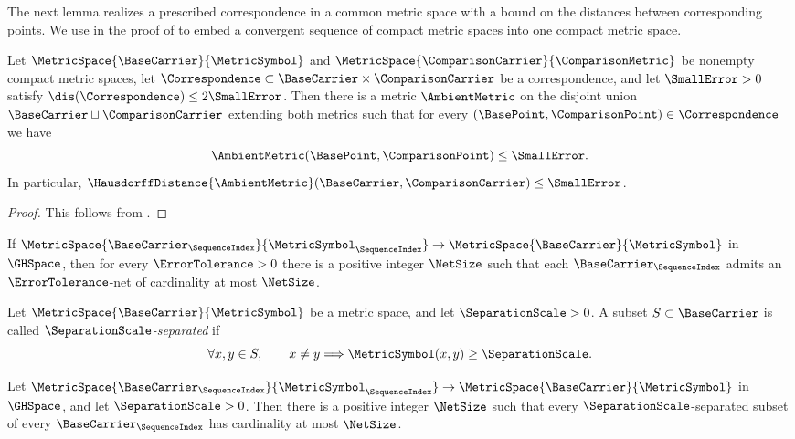 The next lemma realizes a prescribed correspondence in a common metric space
with a bound on the distances between corresponding points.
We use  in the proof of
to embed a convergent sequence of compact metric spaces into one compact metric space.

\begin{lemma}\label{lem:correspondence-embedding}
Let
$\MetricSpace{\BaseCarrier}{\MetricSymbol}$
and
$\MetricSpace{\ComparisonCarrier}{\ComparisonMetric}$
be nonempty compact metric spaces,
let
$\Correspondence\subset\BaseCarrier\times\ComparisonCarrier$
be a correspondence,
and let
$\SmallError>0$
satisfy
$\dis(\Correspondence)\leq2\SmallError$.
Then there is a metric
$\AmbientMetric$
on the disjoint union
$\BaseCarrier\sqcup\ComparisonCarrier$
extending both metrics such that for every
$(\BasePoint,\ComparisonPoint)\in\Correspondence$
we have
\[
 \AmbientMetric(\BasePoint,\ComparisonPoint)\leq\SmallError.
\]
In particular,
$\HausdorffDistance{\AmbientMetric}(\BaseCarrier,\ComparisonCarrier)\leq\SmallError$.
\end{lemma}

\begin{proof}
This follows from
\cite[proof of Theorem~7.3.25, pp.~257--258]{BuragoBuragoIvanov2001}.
\end{proof}

\begin{theorem}\label{thm:uniform-nets}
If
$\MetricSpace{\BaseCarrier_\SequenceIndex}{\MetricSymbol_\SequenceIndex}
 \to\MetricSpace{\BaseCarrier}{\MetricSymbol}$
in
$\GHSpace$,
then for every
$\ErrorTolerance>0$
there is a positive integer
$\NetSize$
such that each
$\BaseCarrier_\SequenceIndex$
admits an
$\ErrorTolerance$-net
of cardinality at most
$\NetSize$.
\end{theorem}

Let
$\MetricSpace{\BaseCarrier}{\MetricSymbol}$
be a metric space, and let
$\SeparationScale>0$.
A subset
$S\subset\BaseCarrier$
is called
\emph{$\SeparationScale$-separated}
if
\[
 \forall x,y\in S,\qquad
 x\ne y\Longrightarrow\MetricSymbol(x,y)\ge\SeparationScale.
\]

\begin{corollary}\label{cor:uniform-separated-sets}
Let
$\MetricSpace{\BaseCarrier_\SequenceIndex}{\MetricSymbol_\SequenceIndex}
 \to\MetricSpace{\BaseCarrier}{\MetricSymbol}$
in
$\GHSpace$,
and let
$\SeparationScale>0$.
Then there is a positive integer
$\NetSize$
such that every
$\SeparationScale$-separated
subset of every
$\BaseCarrier_\SequenceIndex$
has cardinality at most
$\NetSize$.
\end{corollary}

